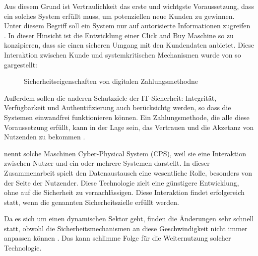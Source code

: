 \vspace{1cm}



Aus diesem Grund ist Vertraulichkeit das erste und wichtgste Voraussetzung, dass ein solches System 
erfüllt muss, um potenziellen neue Kunden zu gewinnen. Unter diesem Begriff soll ein System nur auf 
autorisierte Informationen zugreifen \cite{refbook:SWIS}. In dieser Hinsicht ist die Entwicklung 
einer Click and Buy Maschine so zu konzipieren, dass sie einen sicheren Umgang mit den Kundendaten
anbietet. Diese Interaktion zwischen Kunde und systemkritischen Mechanismen wurde von \cite{refart:HARE}
so gargestellt: 

\begin{figure}[htb]
    \caption{Sicherheitseigenschaften von digitalen Zahlungsmethodne}
    \label{fig:refark_HARE}
\end{figure}


Außerdem sollen die anderen Schutzziele der IT-Sicherheit: Integrität, Verfügbarkeit und
Authentifizierung auch berücksichtg werden, so dass die Systemen einwandfrei funktionieren können.
Ein Zahlungsmethode, die alle diese Voraussetzung erfüllt, kann in der Lage sein, das Vertrauen und 
die Akzetanz von Nutzenden zu bekommen \cite{refart:HARE}. \par


\cite{inbook:MHNS} nennt solche Maschinen Cyber-Physical System (CPS), weil sie eine Interaktion zwischen 
Nutzer und ein oder mehrere Systemen darstellt. In dieser Zusammenarbeit spielt den Datenaustausch 
eine wesentliche Rolle, besonders von der Seite der Nutzender. Diese Technologie zielt eine günstigere 
Entwicklung, ohne auf die Sicherheit zu vernachlässigen. Diese Interaktion findet erfolgereich statt, 
wenn die genannten Sicherheitszielle erfüllt werden.


Da es sich um einen dynamischen Sektor geht, finden die Änderungen sehr schnell statt, obwohl die 
Sicherheitsmechanismen an diese Geschwindigkeit nicht immer anpassen können \cite{refbook:MNIT}.
Das kann schlimme Folge für die Weiternutzung solcher Technologie. 


